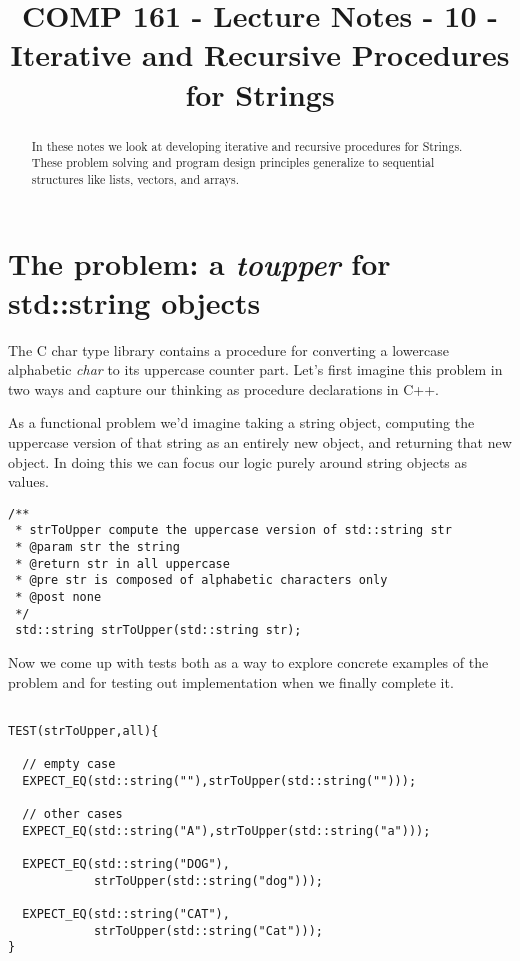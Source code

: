 \documentclass[]{tufte-handout}
\title{COMP 161 - Lecture Notes - 10 - Iterative and Recursive Procedures for Strings}
\begin{document}
 
\maketitle

\begin{abstract}
In these notes we look at developing iterative and recursive procedures for Strings.  These problem solving and program design principles generalize to sequential structures like lists, vectors, and arrays.
\end{abstract}

\section{The problem: a \textit{toupper} for std::string objects}

The C char type library contains a procedure for converting a lowercase alphabetic \textit{char} to its uppercase counter part.  Let's first imagine this problem in two ways and capture our thinking as procedure declarations in C++. 

As a functional problem we'd imagine taking a string object, computing the uppercase version of that string as an entirely new object, and returning that new object.  In doing this we can focus our logic purely around string objects as values. 
  
\begin{verbatim}
/** 
 * strToUpper compute the uppercase version of std::string str
 * @param str the string
 * @return str in all uppercase
 * @pre str is composed of alphabetic characters only
 * @post none
 */
 std::string strToUpper(std::string str);
\end{verbatim}

Now we come up with tests both as a way to explore concrete examples of the problem and for testing out implementation when we finally complete it. 
\begin{verbatim}

TEST(strToUpper,all){

  // empty case
  EXPECT_EQ(std::string(""),strToUpper(std::string("")));

  // other cases
  EXPECT_EQ(std::string("A"),strToUpper(std::string("a")));

  EXPECT_EQ(std::string("DOG"),
            strToUpper(std::string("dog")));
          
  EXPECT_EQ(std::string("CAT"),
            strToUpper(std::string("Cat")));
}
\end{verbatim}
\end{document}
